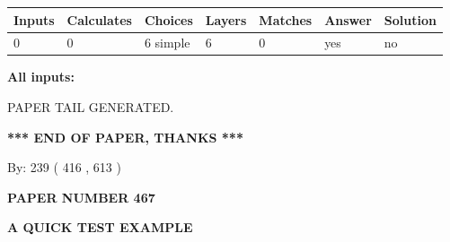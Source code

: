 \documentclass[12pt]{article}
\begin{document}
 
\noindent{}
 
 
   
   
   
   
\noindent\begin{tabular}{|l|l|l|l|l|l|l|}
 \hline
Inputs & Calculates & Choices & Layers & Matches & Answer & Solution \\ \hline
 0  & 
 0  & 
 6
  simple  
  & 
 6  & 
 0  & 
  yes & 
  no 
  \\ \hline
 \end{tabular}
   
   
   
   
\noindent{}
   
   
   
   
\noindent\vspace{0.1in}\hspace{-0.08in} {\textbf{\Large{All inputs: }}}
   
   
   
   
   
   
 \vspace{0.2in}
 
   
   
\vspace{2.0in} PAPER TAIL GENERATED.
   
   
   
   
\vspace{1.0in} 
{\textbf{\large{ *** END OF PAPER, THANKS *** }}} 
   
   
\hspace{1.0in} By: 
 239 ( 416 ,  613 )
   
   
   
   
\newpage 
\setcounter{page}{ 
   467001 } 
   
   
   
   
 {\textbf{ \Large{ PAPER NUMBER  467  }}}
   
   
\vspace{0.2in}
   
   
   
   
   
   
   
   
 \vspace{0.2in}
{\LARGE {\textbf{ A QUICK TEST EXAMPLE}}}
   
\end{document}
